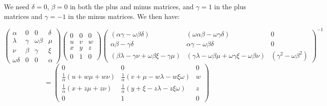\documentclass[10pt]{article}
\begin{document}
We need $\delta =0$, $\beta =0$ in both the plus and minus matrices, and $%
\gamma =1$ in the plus matrices and $\gamma =-1$ in the minus matrices. We
then have:

\[
\left( 
\begin{array}{cccc}
\alpha & 0 & 0 & \delta \\ 
\lambda & \gamma & \omega \beta & \mu \\ 
\nu & \beta & \gamma & \xi \\ 
\omega \delta & 0 & 0 & \alpha%
\end{array}%
\right) \left( 
\begin{array}{ccc}
0 & 0 & 0 \\ 
u & v & w \\ 
x & y & z \\ 
0 & 1 & 0%
\end{array}%
\right) \left( 
\begin{array}{ccc}
(\alpha \gamma -\omega \beta \delta ) & (\omega \alpha \beta -\omega \gamma
\delta ) & 0 \\ 
\alpha \beta -\gamma \delta & \alpha \gamma -\omega \beta \delta & 0 \\ 
(\beta \lambda -\gamma \nu +\omega \beta \xi -\gamma \mu ) & (\gamma \lambda
-\omega \beta \mu +\omega \gamma \xi -\omega \beta \nu ) & (\gamma
^{2}-\omega \beta ^{2})%
\end{array}%
\right) ^{-1} 
\]
\[
=\left( 
\begin{array}{ccc}
0 & 0 & 0 \\ 
\frac{1}{\alpha }\left( u+w\mu +w\nu \right) & \frac{1}{\alpha }\left( v+\mu
-w\lambda -w\xi \omega \right) & w \\ 
\frac{1}{\alpha }\left( x+z\mu +z\nu \right) & \frac{1}{\alpha }\left( y+\xi
-z\lambda -z\xi \omega \right) & z \\ 
0 & 1 & 0%
\end{array}%
\right) \allowbreak 
\]
\end{document}
